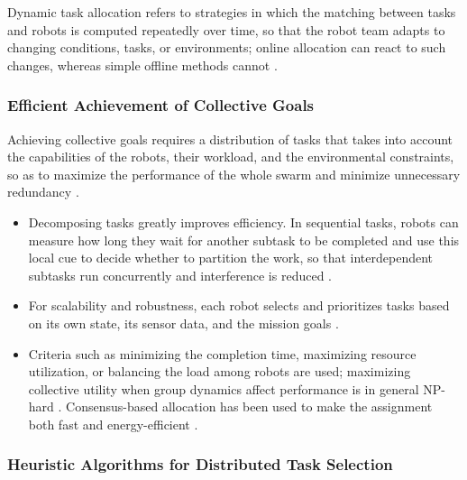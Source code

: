 Dynamic task allocation refers to strategies in which the matching between tasks
and robots is computed repeatedly over time, so that the robot team adapts to
changing conditions, tasks, or environments; online allocation can react to such
changes, whereas simple offline methods cannot \cite{yan2013survey}.

\subsubsection{Efficient Achievement of Collective Goals}

Achieving collective goals requires a distribution of tasks that takes into
account the capabilities of the robots, their workload, and the environmental
constraints, so as to maximize the performance of the whole swarm and minimize
unnecessary redundancy \cite{brambilla2013swarm}.
\begin{itemize}
  \item {} Decomposing tasks greatly improves efficiency.
        In sequential tasks, robots can measure how long they wait for another
        subtask to be completed and use this local cue to decide whether to
        partition the work, so that interdependent subtasks run concurrently and
        interference is reduced \cite{brambilla2013swarm}.
  \item {} For scalability and robustness, each
        robot selects and prioritizes tasks based on its own state, its sensor
        data, and the mission goals \cite{bhowmick2024bio}.
  \item {} Criteria such as minimizing the completion
        time, maximizing resource utilization, or balancing the load among robots
        are used; maximizing collective utility when group dynamics affect
        performance is in general NP-hard \cite{yan2013survey}. Consensus-based
        allocation has been used to make the assignment both fast and
        energy-efficient \cite{mahato2023consensus}.
\end{itemize}

\subsubsection{Heuristic Algorithms for Distributed Task Selection}

